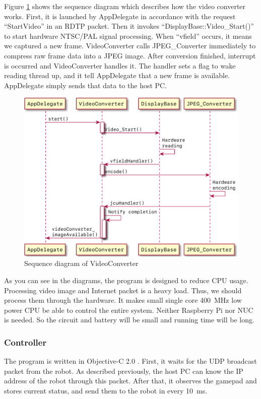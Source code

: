 \documentclass[journal]{IEEEtran}
\begin{document}
Figure \ref{fig:videoConverter} shows the sequence diagram which describes how the video converter works.
First, it is launched by AppDelegate in accordance with the request ``StartVideo'' in an RDTP packet.
Then it invokes ``DisplayBase::Video\_Start()'' to start hardware NTSC/PAL signal processing.
When ``vfield'' occurs, it means we captured a new frame.
VideoConverter calls JPEG\_Converter immediately to compress raw frame data into a JPEG image.
After conversion finished, interrupt is occurred and VideoConverter handles it.
The handler sets a flag to wake reading thread up, and it tell AppDelegate that a new frame is available.
AppDelegate simply sends that data to the host PC.
\begin{figure}
    \centering
    \includegraphics{videoConverter.pdf}
    \caption{Sequence diagram of VideoConverter} \label{fig:videoConverter}
\end{figure}

As you can see in the diagrams, the program is designed to reduce CPU usage.
Processing video image and Internet packet is a heavy load.
Thus, we should process them through the hardware.
It makes small single core \SI{400}{\MHz} low power CPU be able to control the entire system.
Neither Raspberry Pi nor NUC is needed.
So the circuit and battery will be small and running time will be long.

\subsubsection{Controller}
The program is written in Objective-C 2.0 .
First, it waits for the UDP broadcast packet from the robot.
As described previously, the host PC can know the IP address of the robot through this packet.
After that, it observes the gamepad and stores current status, and send them to the robot in every \SI{10}{\ms}.
\end{document}
